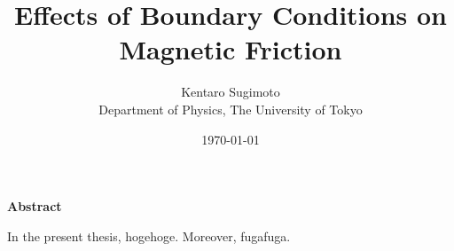 \documentclass[12pt]{book}
\begin{document}
\title{Effects of Boundary Conditions on Magnetic Friction}
\author{Kentaro Sugimoto \\ Department of Physics, The University of Tokyo }
\date{\today}
\maketitle



\clearpage

\begin{center}
\large{{\bf Abstract}}
\end{center}

In the present thesis, hogehoge.
Moreover, fugafuga.

\tableofcontents







\appendix




\begin{thebibliography}{99}
\end{thebibliography}
\end{document}
